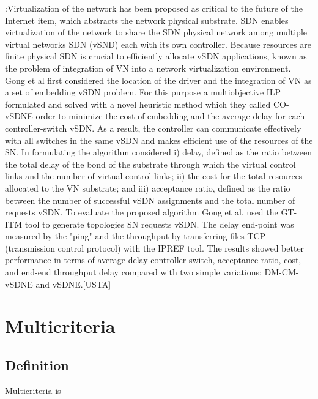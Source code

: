 \documentclass[a4paper,10pt]{article}
\begin{document}
\cite{GoGi17}:Virtualization of the network has been proposed as critical to the future of the Internet item, which abstracts the network physical substrate. SDN enables virtualization of the network to share the SDN physical network among multiple virtual networks SDN (vSND) each with its own controller. Because resources are finite physical SDN is crucial to efficiently allocate vSDN applications, known as the problem of integration of VN into a network virtualization environment. Gong et al first considered the location of the driver and the integration of VN as a set of embedding vSDN problem. For this purpose a multiobjective ILP formulated and solved with a novel heuristic method which they called CO-vSDNE order to minimize the cost of embedding and the average delay for each controller-switch vSDN. As a result, the controller can communicate effectively with all switches in the same vSDN and makes efficient use of the resources of the SN. In formulating the algorithm considered i) delay, defined as the ratio between the total delay of the bond of the substrate through which the virtual control links and the number of virtual control links; ii) the cost for the total resources allocated to the VN substrate; and iii) acceptance ratio, defined as the ratio between the number of successful vSDN assignments and the total number of requests vSDN.
To evaluate the proposed algorithm Gong et al. used the GT-ITM tool to generate topologies SN requests vSDN. The delay end-point was measured by the "ping" and the throughput by transferring files TCP (transmission control protocol) with the IPREF tool. The results showed better performance in terms of average delay controller-switch, acceptance ratio, cost, and end-end throughput delay compared with two simple variations: DM-CM-vSDNE and vSDNE.[USTA]



\section{Multicriteria}
\subsection{Definition}
Multicriteria is
\end{document}
